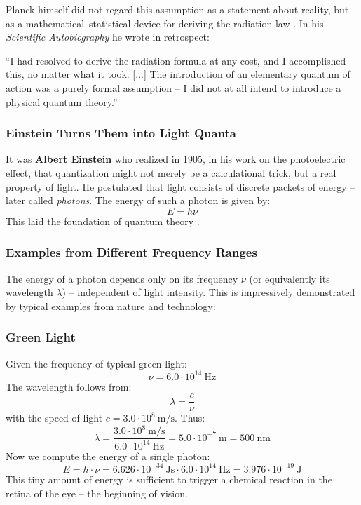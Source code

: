 Planck himself did not regard this assumption as a statement about reality, but as a mathematical–statistical device for deriving the radiation law \cite{planck1948}. In his \emph{Scientific Autobiography} he wrote in retrospect:
\newpage
\noindent
\begin{tcolorbox}[physikbox, title={Max Planck (1905)\cite{planck1948}}]
	\label{box:planck1948}
	“I had resolved to derive the radiation formula at any cost, and I accomplished this, no matter what it took. [...] The introduction of an elementary quantum of action was a purely formal assumption – I did not at all intend to introduce a physical quantum theory.”
\end{tcolorbox}

\subsubsection{Einstein Turns Them into Light Quanta}

It was \textbf{Albert Einstein} who realized in 1905, in his work on the photoelectric effect, that quantization might not merely be a calculational trick, but a real property of light. He postulated that light consists of discrete packets of energy – later called \emph{photons}. The energy of such a photon is given by:
$$
E = h \nu
$$
This laid the foundation of quantum theory \cite{einstein1905}.

\subsubsection{Examples from Different Frequency Ranges}

The energy of a photon depends only on its frequency $\nu$ (or equivalently its wavelength $\lambda$) – independent of light intensity. This is impressively demonstrated by typical examples from nature and technology:

\subsubsection*{Green Light}
Given the frequency of typical green light:
$$
\nu = 6.0 \cdot 10^{14}~\mathrm{Hz}
$$
The wavelength follows from:
$$
\lambda = \frac{c}{\nu}
$$
with the speed of light \( c = 3.0 \cdot 10^8~\mathrm{m/s} \). Thus:
$$
\lambda = \frac{3.0 \cdot 10^8~\mathrm{m/s}}{6.0 \cdot 10^{14}~\mathrm{Hz}} = 5.0 \cdot 10^{-7}~\mathrm{m} = 500~\mathrm{nm}
$$
Now we compute the energy of a single photon:
$$
E = h \cdot \nu = 6.626 \cdot 10^{-34}~\mathrm{Js} \cdot 6.0 \cdot 10^{14}~\mathrm{Hz} = 3.976 \cdot 10^{-19}~\mathrm{J}
$$
This tiny amount of energy is sufficient to trigger a chemical reaction in the retina of the eye – the beginning of vision.
\vspace{1em}

